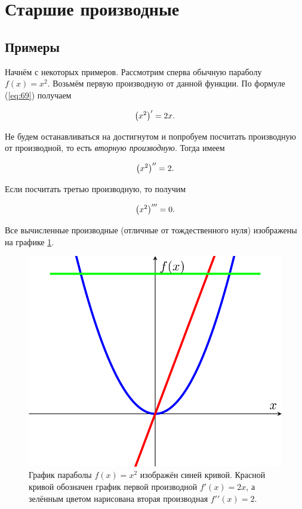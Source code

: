 \documentclass[12pt]{article}
\begin{document}
\section{Старшие производные}
\subsection{Примеры}
Начнём с некоторых примеров. Рассмотрим сперва обычную параболу $f(x) = x^2$. Возьмём первую производную от данной функции. По формуле (\ref{eq:69}) получаем

\begin{equation}
	\qty(x^2)' = 2 x.
\end{equation}

Не будем останавливаться на достигнутом и попробуем посчитать производную от производной, то есть \emph{вторную производную}. Тогда имеем

\begin{equation}
	\qty(x^2)'' = 2.
\end{equation}

Если посчитать третью производную, то получим

\begin{equation}
	\qty(x^2)''' = 0.
\end{equation}

Все вычисленные производные (отличные от тождественного нуля) изображены на графике \ref{fig:69}.

\begin{figure}[htbp]
\centering
\includegraphics[width=1\linewidth]{fig4}
\caption{График параболы $f(x) = x^2$ изображён синей кривой. Красной кривой обозначен график первой производной $f'(x) = 2x$, а зелённым цветом нарисована вторая производная $f'{}'{}(x)=2$.}
\label{fig:69}
\end{figure}
\end{document}
